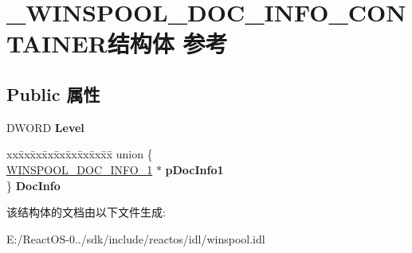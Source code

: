 \hypertarget{struct___w_i_n_s_p_o_o_l___d_o_c___i_n_f_o___c_o_n_t_a_i_n_e_r}{}\section{\+\_\+\+W\+I\+N\+S\+P\+O\+O\+L\+\_\+\+D\+O\+C\+\_\+\+I\+N\+F\+O\+\_\+\+C\+O\+N\+T\+A\+I\+N\+E\+R结构体 参考}
\label{struct___w_i_n_s_p_o_o_l___d_o_c___i_n_f_o___c_o_n_t_a_i_n_e_r}
\subsection*{Public 属性}
\begin{DoxyCompactItemize}
\item 
\mbox{\label{struct___w_i_n_s_p_o_o_l___d_o_c___i_n_f_o___c_o_n_t_a_i_n_e_r_af6011ef230661e25c94d4d2a2b40e2e9}} 
D\+W\+O\+RD {\bfseries Level}
\item 
\mbox{\label{struct___w_i_n_s_p_o_o_l___d_o_c___i_n_f_o___c_o_n_t_a_i_n_e_r_a6151c17c9fb811e907cd80b38a7766ca}} 
\begin{tabbing}
xx\=xx\=xx\=xx\=xx\=xx\=xx\=xx\=xx\=\kill
union \{\\
\>\hyperlink{struct___w_i_n_s_p_o_o_l___d_o_c___i_n_f_o__1}{WINSPOOL\_DOC\_INFO\_1} $\ast$ {\bfseries pDocInfo1}\\
\} {\bfseries DocInfo}\\

\end{tabbing}\end{DoxyCompactItemize}


该结构体的文档由以下文件生成\+:\begin{DoxyCompactItemize}
\item 
E\+:/\+React\+O\+S-\/0../sdk/include/reactos/idl/winspool.\+idl\end{DoxyCompactItemize}
